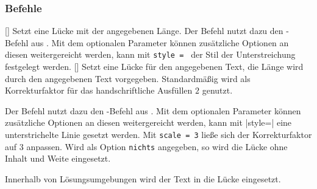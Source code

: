 \subsubsection{Befehle}
\begin{commands}
    []
        Setzt eine Lücke mit der angegebenen Länge. Der Befehl nutzt dazu den -Befehl aus . Mit dem optionalen Parameter können zusätzliche Optionen an diesen weitergereicht werden, \zB\space kann mit \texttt{style = } der Stil der Unterstreichung festgelegt werden.
    []
        Setzt eine Lücke für den angegebenen Text, die Länge wird durch den angegebenen Text vorgegeben. Standardmäßig wird als Korrekturfaktor für das handschriftliche Ausfüllen $2$ genutzt.

        Der Befehl nutzt dazu den -Befehl aus . Mit dem optionalen Parameter können zusätzliche Optionen an diesen weitergereicht werden, \zB\space kann mit \verbcode|style=| eine unterstrichelte Linie gesetzt werden. Mit \texttt{scale = 3} ließe sich der Korrekturfaktor auf $3$ anpassen. Wird als Option \texttt{nichts} angegeben, so wird die Lücke ohne Inhalt und Weite eingesetzt.

        Innerhalb von Lösungsumgebungen wird der Text in die Lücke eingesetzt.

%

\end{commands}

